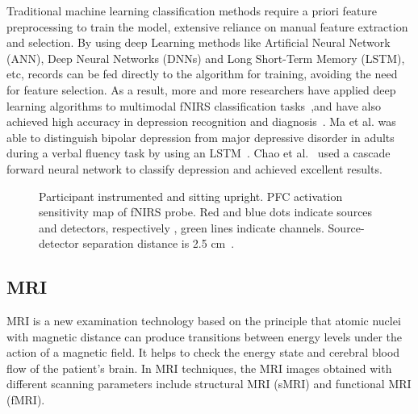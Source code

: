 Traditional machine learning classification methods require a priori feature preprocessing to train the model, extensive reliance on manual feature extraction and selection. By using deep Learning methods like Artificial Neural Network (ANN), Deep Neural Networks (DNNs) and Long Short-Term Memory (LSTM), etc, records can be fed directly to the algorithm for training, avoiding the need for feature selection. As a result, more and more researchers have applied deep learning algorithms to multimodal fNIRS classification tasks~\cite{2022Deep},and have also achieved high accuracy in depression recognition and diagnosis~\cite{2021Depression}.
Ma et al.\cite{2020DISTINGUISHING} was able to distinguish bipolar depression from major depressive disorder in adults during a verbal fluency task by using an LSTM~.
Chao et al.~\cite{2021fNIRS} used a cascade forward neural network to classify depression and achieved excellent results.


\begin{figure}[tbp]
	\centering
	
	\caption{
    Participant instrumented and sitting upright.
    PFC activation sensitivity map of fNIRS probe. Red and blue dots indicate sources and detectors, respectively , green lines indicate channels. Source-detector separation distance is 2.5 cm~\cite{2020Classifying}.
	}
	\label{fNIRS}
\end{figure}

\subsection{MRI}

MRI is a new examination technology based on the principle that atomic nuclei with magnetic distance can produce transitions between energy levels under the action of a magnetic field. It helps to check the energy state and cerebral blood flow of the patient's brain.
In MRI techniques, the MRI images obtained with different scanning parameters include structural MRI (sMRI) and functional MRI (fMRI).

